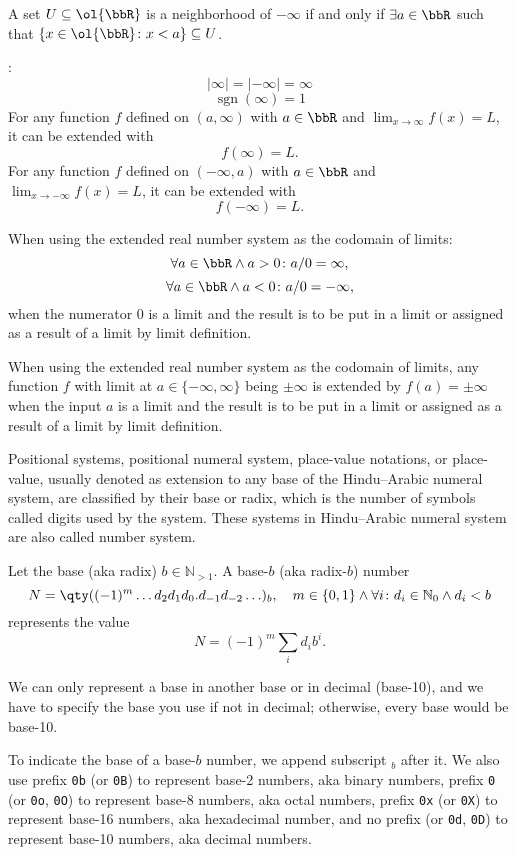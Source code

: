 \documentclass[a4paper,12pt]{report}
\begin{document}
\begin{itemizle}
A set $U\subseteq\ol{\bbR}$ is a neighborhood of $-\infty$ if and only if $\exists a\in\bbR$ such that $\{x\in\ol{\bbR}\colon x<a\}\subseteq U$.
\item {}:
\[|\infty|=|-\infty|=\infty\]
\[\operatorname{sgn}(\infty)=1\]
For any function $f$ defined on $(a,\infty)$ with $a\in\bbR$ and $\lim_{x\to\infty}f(x)=L$, it can be extended with
\[f(\infty)=L.\]
For any function $f$ defined on $(-\infty,a)$ with $a\in\bbR$ and $\lim_{x\to-\infty}f(x)=L$, it can be extended with
\[f(-\infty)=L.\]
\eit


\item When using the extended real number system as the codomain of limits:
\[\forall a\in\bbR\land a>0\colon a/0=\infty,\]
\[\forall a\in\bbR\land a<0\colon a/0=-\infty,\]
when the numerator $0$ is a limit and the result is to be put in a limit or assigned as a result of a limit by limit definition.
\item When using the extended real number system as the codomain of limits, any function $f$ with limit at $a\in\{-\infty,\infty\}$ being $\pm\infty$ is extended by $f(a)=\pm\infty$ when the input $a$ is a limit and the result is to be put in a limit or assigned as a result of a limit by limit definition.
\eit



Positional systems, positional numeral system, place-value notations, or place-value, usually denoted as extension to any base of the Hindu–Arabic numeral system, are classified by their base or radix, which is the number of symbols called digits used by the system. These systems in Hindu–Arabic numeral system are also called number system.

Let the base (aka radix) $b\in\mathbb{N}_{>1}$. A base-$b$ (aka radix-$b$) number
\[N=\qty((-1)^m\ldots d_2d_1d_0.d_{-1}d_{-2}\ldots)_b,\quad m\in\{0,1\}\land\forall i\colon d_i\in\mathbb{N}_0\land d_i<b\]
represents the value
\[N =(-1)^m\sum_id_ib^i.\]

We can only represent a base in another base or in decimal (base-10), and we have to specify the base you use if not in decimal; otherwise, every base would be base-10.

To indicate the base of a base-$b$ number, we append subscript $_b$ after it. We also use prefix \verb|0b| (or \verb|0B|) to represent base-2 numbers, aka binary numbers, prefix \verb|0| (or \verb|0o|, \verb|0O|) to represent base-8 numbers, aka octal numbers, prefix \verb|0x| (or \verb|0X|) to represent base-16 numbers, aka hexadecimal number, and no prefix (or \verb|0d|, \verb|0D|) to represent base-10 numbers, aka decimal numbers.


\end{itemizle}
\end{document}
